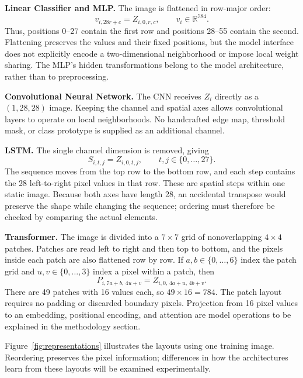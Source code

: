 \textbf{Linear Classifier and MLP.}
The image is flattened in row-major order:
\begin{equation}
 v_{i,28r+c}=Z_{i,0,r,c},\qquad v_i\in\mathbb{R}^{784}.
 \label{eq:flattening}
\end{equation}
Thus, positions 0--27 contain the first row and positions 28--55 contain
the second. Flattening preserves the values and their fixed positions, but
the model interface does not explicitly encode a two-dimensional neighborhood
or impose local weight sharing. The MLP's hidden transformations belong to
the model architecture, rather than to preprocessing.

\textbf{Convolutional Neural Network.}
The CNN receives \(Z_i\) directly as a \((1,28,28)\) image. Keeping the
channel and spatial axes allows convolutional layers to operate on local
neighborhoods. No handcrafted edge map, threshold mask, or class prototype
is supplied as an additional channel.

\textbf{LSTM.}
The single channel dimension is removed, giving
\begin{equation}
 S_{i,t,j}=Z_{i,0,t,j},\qquad t,j\in\{0,\ldots,27\}.
 \label{eq:rows}
\end{equation}
The sequence moves from the top row to the bottom row, and each step contains
the 28 left-to-right pixel values in that row. These are spatial steps within
one static image. Because both axes have length 28, an accidental transpose
would preserve the shape while changing the sequence; ordering must therefore
be checked by comparing the actual elements.

\textbf{Transformer.}
The image is divided into a \(7\times7\) grid of nonoverlapping
\(4\times4\) patches. Patches are read left to right and then top to bottom,
and the pixels inside each patch are also flattened row by row. If
\(a,b\in\{0,\ldots,6\}\) index the patch grid and
\(u,v\in\{0,\ldots,3\}\) index a pixel within a patch, then
\begin{equation}
 P_{i,7a+b,\,4u+v}=Z_{i,0,\,4a+u,\,4b+v}.
 \label{eq:patches}
\end{equation}
There are 49 patches with 16 values each, so \(49\times16=784\).
The patch layout requires no padding or discarded boundary pixels.
Projection from 16 pixel values to an embedding, positional encoding, and
attention are model operations to be explained in the methodology section.

Figure~\ref{fig:representations} illustrates the layouts using one training
image. Reordering preserves the pixel information; differences in how the
architectures learn from these layouts will be examined experimentally.
\FloatBarrier

